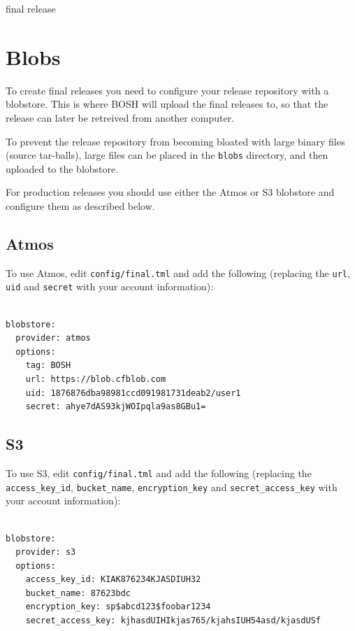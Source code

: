 final release

\section{Blobs}
\label{blobs}

To create final releases you need to configure your release repository with a blobstore. This is where BOSH will upload the final releases to, so that the release can later be retreived from another computer.

To prevent the release repository from becoming bloated with large binary files (source tar-balls), large files can be placed in the \texttt{blobs} directory, and then uploaded to the blobstore.

For production releases you should use either the Atmos or S3 blobstore and configure them as described below.

\subsection{Atmos}
\label{atmos}

To use Atmos, edit \texttt{config\slash final.tml} and add the following (replacing the \texttt{url}, \texttt{uid} and \texttt{secret} with your account information):

\begin{adjustwidth}{2.5em}{2.5em}
\begin{verbatim}

blobstore:
  provider: atmos
  options:
    tag: BOSH
    url: https://blob.cfblob.com
    uid: 1876876dba98981ccd091981731deab2/user1
    secret: ahye7dAS93kjWOIpqla9as8GBu1=

\end{verbatim}
\end{adjustwidth}

\subsection{S3}
\label{s3}

To use S3, edit \texttt{config\slash final.tml} and add the following (replacing the \texttt{access\_key\_id}, \texttt{bucket\_name}, \texttt{encryption\_key} and \texttt{secret\_access\_key} with your account information):

\begin{adjustwidth}{2.5em}{2.5em}
\begin{verbatim}

blobstore:
  provider: s3
  options:
    access_key_id: KIAK876234KJASDIUH32
    bucket_name: 87623bdc
    encryption_key: sp$abcd123$foobar1234
    secret_access_key: kjhasdUIHIkjas765/kjahsIUH54asd/kjasdUSf

\end{verbatim}
\end{adjustwidth}

